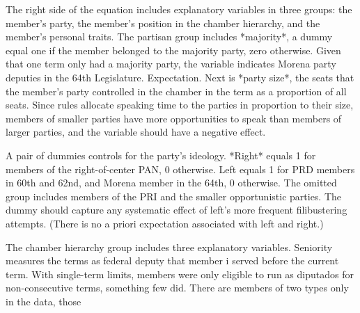 \documentclass[letter,12pt]{article}
\begin{document}
The right side of the equation includes explanatory variables in three groups: the member's party, the member's position in the chamber hierarchy, and the member's personal traits. The partisan group includes *majority*, a dummy equal one if the member belonged to the majority party, zero otherwise. Given that one term only had a majority party, the variable indicates Morena party deputies in the 64th Legislature. Expectation. Next is *party size*, the seats that the member's party controlled in the chamber in the term as a proportion of all seats. Since rules allocate speaking time to the parties in proportion to their size, members of smaller parties have more opportunities to speak than  members of larger parties, and the variable should have a negative effect.

A pair of dummies controls for the party's ideology. *Right* equals 1 for members of the right-of-center PAN, 0 otherwise. Left equals 1 for PRD members in 60th and 62nd, and Morena member in the 64th, 0 otherwise. The omitted group includes members of the PRI and the smaller opportunistic parties. The dummy should capture any systematic effect of left's more frequent filibustering attempts. (There is no a priori expectation associated with left and right.)

The chamber hierarchy group includes three explanatory variables. Seniority measures the terms as federal deputy that member i served before the current term. With single-term limits, members were only eligible to run as diputados for non-consecutive terms, something few did. There are members of two types only in the data, those  
\end{document}
